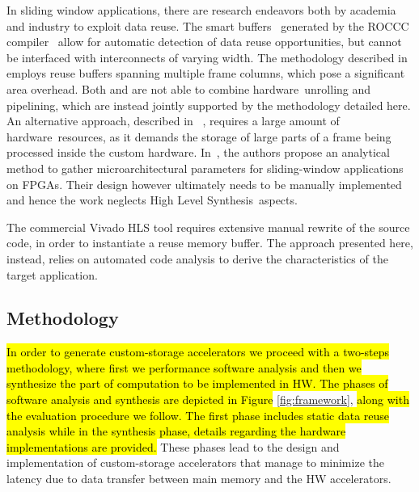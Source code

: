 \documentclass[]{usiinfthesis}
\newcommand{\HW}{{hardware}}
\newcommand{\HLS}{{High Level Synthesis}}
\begin{document}
In sliding window applications, there are research endeavors
both by academia and industry to exploit data reuse. The smart
buffers~\cite{GuoJun04} generated by the ROCCC
compiler~\cite{VillarrealMay10} allow for automatic detection of data
reuse opportunities, but cannot be interfaced 
with interconnects of varying width.
The methodology
described in \cite{MeeusMar14} employs reuse buffers spanning multiple
frame columns, which pose a significant area
overhead. Both \cite{GuoJun04} and \cite{MeeusMar14} are not able
to combine \HW\ unrolling and pipelining, which are instead jointly
supported by the methodology detailed here. An alternative 
approach, described in
~\cite{DongMar07}, requires a large amount of \HW\ resources, as it 
demands the storage of large parts of a frame being processed inside the custom
hardware.  In~\cite{LeeserApr06}, the authors propose an analytical
method to gather microarchitectural parameters for sliding-window
applications on FPGAs. Their design however ultimately needs to be
manually implemented and hence the work neglects \HLS\ aspects.\par
%
The commercial Vivado HLS tool requires
extensive manual rewrite of the source code, in order to instantiate
a reuse memory buffer. The approach presented 
here, instead, relies on automated code
analysis to derive the characteristics of the target application.\par 



\subsection{Methodology}
\label{sec:dr_meth}

\hl{
In order to generate custom-storage accelerators we proceed with a
two-steps methodology, where first we performance software analysis and 
then we synthesize the part of computation to be implemented in HW. The phases
of software analysis and synthesis are
depicted in Figure 
}
\ref{fig:framework}, 
\hl{
along with the evaluation
procedure we follow. 
The first phase includes static data reuse analysis while
in the synthesis phase, details regarding the hardware implementations are provided.
}
These phases lead to the design and implementation of 
custom-storage accelerators that manage to minimize the latency due to data 
transfer between main memory and the HW accelerators.
\end{document}
